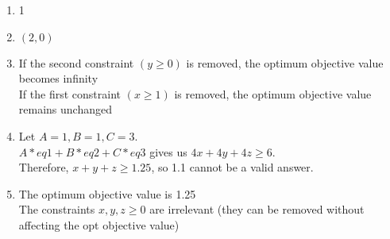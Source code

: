 \documentclass[11pt]{article}
\begin{document}
\begin{enumerate}
    \item 1
    \item $(2, 0)$
    \item 
    If the second constraint $(y \geq 0)$ is removed, the optimum objective value becomes infinity\\
    If the first constraint $(x \geq 1)$ is removed, the optimum objective value remains unchanged
    \item 
    Let $A = 1, B = 1, C = 3$.\\
    $A * eq1 + B * eq2 + C * eq3$ gives us $4x + 4y + 4z \geq 6$.\\
    Therefore, $x + y + z \geq 1.25$, so 1.1 cannot be a valid answer.
    \item 
    The optimum objective value is 1.25\\
    The constraints $x, y, z \geq 0$ are irrelevant (they can be removed without affecting the opt objective value)
\end{enumerate}
\end{document}
